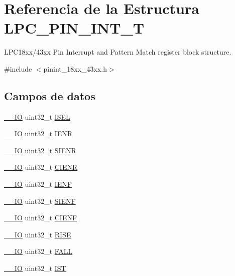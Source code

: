 \hypertarget{struct_l_p_c___p_i_n___i_n_t___t}{}\section{Referencia de la Estructura L\+P\+C\+\_\+\+P\+I\+N\+\_\+\+I\+N\+T\+\_\+T}
\label{struct_l_p_c___p_i_n___i_n_t___t}


L\+P\+C18xx/43xx Pin Interrupt and Pattern Match register block structure.  




{\ttfamily \#include $<$pinint\+\_\+18xx\+\_\+43xx.\+h$>$}

\subsection*{Campos de datos}
\begin{DoxyCompactItemize}
\item 
\hyperlink{core__sc300_8h_aec43007d9998a0a0e01faede4133d6be}{\+\_\+\+\_\+\+IO} uint32\+\_\+t \hyperlink{struct_l_p_c___p_i_n___i_n_t___t_aa4712e303826c4f50c0b69ffd8a3ecff}{I\+S\+EL}
\item 
\hyperlink{core__sc300_8h_aec43007d9998a0a0e01faede4133d6be}{\+\_\+\+\_\+\+IO} uint32\+\_\+t \hyperlink{struct_l_p_c___p_i_n___i_n_t___t_a3d38f040352ef92834598eaa3bc1d984}{I\+E\+NR}
\item 
\hyperlink{core__sc300_8h_aec43007d9998a0a0e01faede4133d6be}{\+\_\+\+\_\+\+IO} uint32\+\_\+t \hyperlink{struct_l_p_c___p_i_n___i_n_t___t_a46795e5ae5ba2c24b8d75c84b406a2d2}{S\+I\+E\+NR}
\item 
\hyperlink{core__sc300_8h_aec43007d9998a0a0e01faede4133d6be}{\+\_\+\+\_\+\+IO} uint32\+\_\+t \hyperlink{struct_l_p_c___p_i_n___i_n_t___t_ae4c87e64e6141764f854f406162081dd}{C\+I\+E\+NR}
\item 
\hyperlink{core__sc300_8h_aec43007d9998a0a0e01faede4133d6be}{\+\_\+\+\_\+\+IO} uint32\+\_\+t \hyperlink{struct_l_p_c___p_i_n___i_n_t___t_afc5d747cb3b672a0fde5c2cc100444b3}{I\+E\+NF}
\item 
\hyperlink{core__sc300_8h_aec43007d9998a0a0e01faede4133d6be}{\+\_\+\+\_\+\+IO} uint32\+\_\+t \hyperlink{struct_l_p_c___p_i_n___i_n_t___t_a41b168f6056decabbc18b9336337d1df}{S\+I\+E\+NF}
\item 
\hyperlink{core__sc300_8h_aec43007d9998a0a0e01faede4133d6be}{\+\_\+\+\_\+\+IO} uint32\+\_\+t \hyperlink{struct_l_p_c___p_i_n___i_n_t___t_a04ab7f0e571a2e496786159b8a983c38}{C\+I\+E\+NF}
\item 
\hyperlink{core__sc300_8h_aec43007d9998a0a0e01faede4133d6be}{\+\_\+\+\_\+\+IO} uint32\+\_\+t \hyperlink{struct_l_p_c___p_i_n___i_n_t___t_a531a810d7097a9175434fc10bed8d900}{R\+I\+SE}
\item 
\hyperlink{core__sc300_8h_aec43007d9998a0a0e01faede4133d6be}{\+\_\+\+\_\+\+IO} uint32\+\_\+t \hyperlink{struct_l_p_c___p_i_n___i_n_t___t_abd34712d9e113e4f925089fbc45998e3}{F\+A\+LL}
\item 
\hyperlink{core__sc300_8h_aec43007d9998a0a0e01faede4133d6be}{\+\_\+\+\_\+\+IO} uint32\+\_\+t \hyperlink{struct_l_p_c___p_i_n___i_n_t___t_a4c6f04cecd7e773be42dc6b5d7f5368a}{I\+ST}
\end{DoxyCompactItemize}


